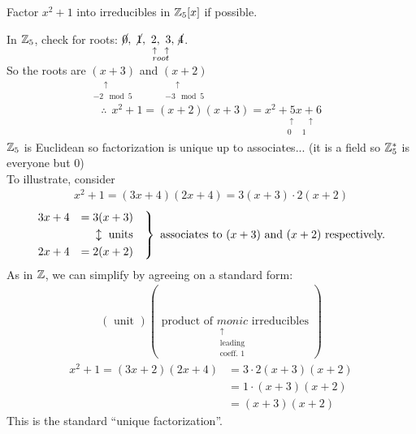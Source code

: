 \begin{example}
    Factor $x^2+1$ into irreducibles in ${\mathbb{ Z}}_5[x]$ if possible. \\ \steezybreak

    In ${\mathbb{ Z}}_5$, check for roots: $\cancel{0}, \ \cancel{1}, \underset{\substack{\uparrow \ \  \uparrow \\ root}}{\ 2, \ 3,} \ \cancel{4}$. \\
    So the roots are $\underset{\substack{\ \ \ \ \ \  \uparrow \\ -2 \mod 5}}{(x+3)}$ and $\underset{\substack{\ \ \ \ \ \  \uparrow \\ -3 \mod 5}}{(x+2)}$
    \begin{align*}
        \therefore \ \ x^2+1 = (x+2)(x+3) = \underset{\substack{\ \ \ \ \ \ \ \ \  \uparrow \ \ \ \ \ \ \uparrow \\ \ \ \ \ \ \ \ \ \  0 \ \ \ \ \ \ 1 }}{x^2 + 5x + 6}
    \end{align*}
    ${\mathbb{ Z}}_5$ is Euclidean so factorization is unique up to associates... (it is a field so ${\mathbb{ Z}}_5^*$ is everyone but $0$) \\ \steezybreak
    To illustrate, consider 
    \begin{align*}
        x^2+1 = (3x+4)(2x+4) = 3(x+3)\cdot 2(x+2)
    \end{align*}
    \begin{align*}
        \begin{rcases}
            3x+4 &= 3(x+3) \ \ \ \\
            & \ \ \ \ \updownarrow \text{ units} \\
            2x+4 &= 2(x+2) \ \ \ 
        \end{rcases}
        \text{ associates to }(x+3) \text{ and }(x+2) \text{ respectively.}
    \end{align*}
    As in ${\mathbb{ Z}}$, we can simplify by agreeing on a standard form:
    \begin{align*}
        (\text{ unit })(\text{ product of }\underset{\substack{\uparrow \\ \text{leading} \\ \text{coeff. 1}}}{monic} \text{ irreducibles })
    \end{align*}
    \begin{align*}
        x^2+1 = (3x+2)(2x+4)&= 3\cdot 2 (x+3)(x+2) \\
        &= 1\cdot (x+3)(x+2) \\
        &=(x+3)(x+2)
    \end{align*}
    This is the standard ``unique factorization''.
\end{example}
